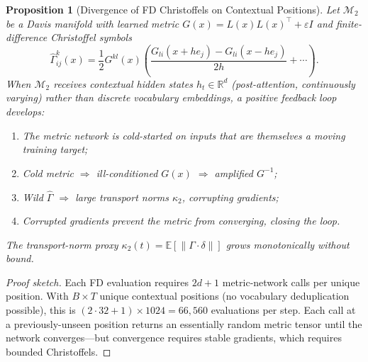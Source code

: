\documentclass[11pt,a4paper]{article}
\newtheorem{proposition}[theorem]{Proposition}
\theoremstyle{definition}
\theoremstyle{remark}
\begin{document}
\begin{proposition}[Divergence of FD Christoffels on Contextual 
Positions]\label{prop:fd_divergence_main}
Let $\mathcal{M}_2$ be a Davis manifold with learned metric 
$G(x) = L(x)L(x)^\top + \varepsilon I$ and finite-difference 
Christoffel symbols
\begin{equation}\label{eq:fd_christoffel_main}
    \hat{\Gamma}^k_{ij}(x) = \frac{1}{2} G^{kl}(x) \left(
    \frac{G_{li}(x + h e_j) - G_{li}(x - h e_j)}{2h}
    + \cdots
    \right).
\end{equation}
When $\mathcal{M}_2$ receives contextual hidden states 
$h_t \in \mathbb{R}^d$ (post-attention, continuously varying) 
rather than discrete vocabulary embeddings, a positive feedback 
loop develops:
\begin{enumerate}[nosep]
    \item The metric network is cold-started on inputs that are 
    themselves a moving training target;
    \item Cold metric $\Rightarrow$ ill-conditioned $G(x)$ 
    $\Rightarrow$ amplified $G^{-1}$;
    \item Wild $\hat{\Gamma}$ $\Rightarrow$ large transport norms 
    $\kappa_2$, corrupting gradients;
    \item Corrupted gradients prevent the metric from converging, 
    closing the loop.
\end{enumerate}
The transport-norm proxy $\kappa_2(t) = 
\mathbb{E}[\|\Gamma \cdot \delta\|]$ grows monotonically without 
bound.
\end{proposition}

\begin{proof}[Proof sketch]
Each FD evaluation requires $2d + 1$ metric-network calls per 
unique position. With $B \times T$ unique contextual positions 
(no vocabulary deduplication possible), this is 
$(2 \cdot 32 + 1) \times 1024 = 66{,}560$ evaluations per step. 
Each call at a previously-unseen position returns an essentially 
random metric tensor until the network converges---but convergence 
requires stable gradients, which requires bounded Christoffels.
\end{proof}
\end{document}
